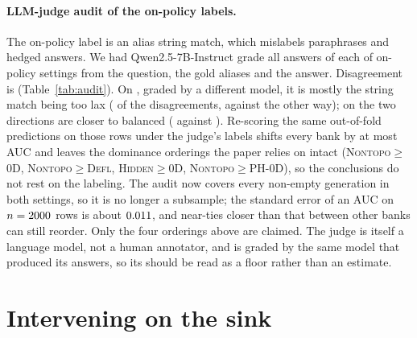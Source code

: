 \paragraph{LLM-judge audit of the on-policy labels.} The on-policy label is an alias string match, which mislabels paraphrases and hedged answers. We had Qwen2.5-7B-Instruct grade all \AuditN{} answers of each of \AuditSettings{} on-policy settings from the question, the gold aliases and the answer. Disagreement is \AuditDisagreeRange{} (Table~\ref{tab:audit}). On \AuditOtherSetting{}, graded by a different model, it is mostly the string match being too lax (\AuditOtherLax{} of the disagreements, against \AuditOtherStrict{} the other way); on \AuditSelfSetting{} the two directions are closer to balanced (\AuditSelfLax{} against \AuditSelfStrict{}). Re-scoring the same out-of-fold predictions on those rows under the judge's labels shifts every bank by at most \AuditMaxAucShift{} AUC and leaves the dominance orderings the paper relies on intact (\textsc{Nontopo}${}\ge{}$\textsc{0D}, \textsc{Nontopo}${}\ge{}$\textsc{Defl}, \textsc{Hidden}${}\ge{}$\textsc{0D}, \textsc{Nontopo}${}\ge{}$\textsc{PH-0D}), so the conclusions do not rest on the labeling. The audit now covers every non-empty generation in both settings, so it is no longer a subsample; the standard error of an AUC on $n=2000{}$ rows is about $0.011{}$, and near-ties closer than that between other banks can still reorder. Only the four orderings above are claimed. The judge is itself a language model, not a human annotator, and \AuditSelfSetting{} is graded by the same model that produced its answers, so its \AuditSelfRate{} should be read as a floor rather than an estimate.
\begin{table}[h]
\centering
\small
\caption{\textbf{LLM-judge audit of the on-policy labels.} ``match 0/judge 1'': the string match calls it hallucinated and the judge does not. Last column: largest change in any bank's AUC on the audited rows when the judge's labels replace the string match.}
\label{tab:audit}
\SinkTableAudit
\end{table}

\section{Intervening on the sink}
\label{app:causal}
\RESULTSCAUSAL
\begin{table}[h]
\centering
\small
\caption{\textbf{Sink-bias intervention} (teacher-forced TruthfulQA; labels unchanged). A constant $b$ is added to the attention logit of key $0$ for every query after token $0$, in every head and layer. $\defect_P{=}0$: share of prompt-coned head graphs. Sink top: share of head graphs in which token $0$ is every response token's most-attended prompt token. $\rho$: median per-head rank correlation between TOHA's $d$ and the response sink score. Remaining columns: AUCs as in Table~\ref{tab:toha}.}
\label{tab:causal}
\SinkTableTohaCausal
\end{table}

